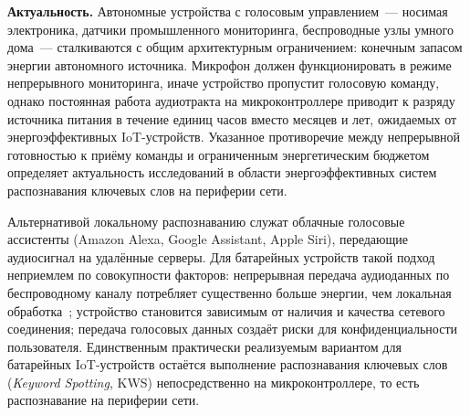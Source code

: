 
\textbf{Актуальность.} Автономные устройства с голосовым
управлением~--- носимая электроника, датчики промышленного мониторинга,
беспроводные узлы умного дома~--- сталкиваются с общим архитектурным
ограничением: конечным запасом энергии автономного источника. Микрофон
должен функционировать в режиме непрерывного мониторинга, иначе
устройство пропустит голосовую команду, однако постоянная работа
аудиотракта на микроконтроллере приводит к разряду источника питания в
течение единиц часов вместо месяцев и лет, ожидаемых от
энергоэффективных IoT-устройств. Указанное противоречие между
непрерывной готовностью к приёму команды и ограниченным энергетическим
бюджетом определяет актуальность исследований в области
энергоэффективных систем распознавания ключевых слов на периферии сети.

Альтернативой локальному распознаванию служат облачные голосовые
ассистенты (Amazon Alexa, Google Assistant, Apple Siri), передающие
аудиосигнал на удалённые серверы. Для батарейных устройств такой подход
неприемлем по совокупности факторов: непрерывная передача аудиоданных по
беспроводному каналу потребляет существенно больше энергии, чем локальная
обработка~\cite{src:9}; устройство становится зависимым от наличия и
качества сетевого соединения; передача голосовых данных создаёт риски для
конфиденциальности пользователя. Единственным практически реализуемым
вариантом для батарейных IoT-устройств остаётся выполнение распознавания
ключевых слов (\textit{Keyword Spotting}, KWS) непосредственно на
микроконтроллере, то есть распознавание на периферии сети.

